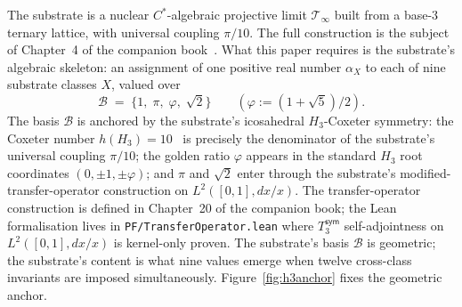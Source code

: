 \documentclass[11pt,a4paper]{amsart}
\theoremstyle{plain}
\theoremstyle{definition}
\begin{document}
The substrate is a nuclear $C^{*}$-algebraic projective limit $\mathcal{T}_\infty$ built from a base-$3$ ternary lattice, with universal coupling $\pi/10$. The full construction is the subject of Chapter~4 of the companion book~\cite{cohen2026book}. What this paper requires is the substrate's algebraic skeleton: an assignment of one positive real number $\alpha_X$ to each of nine substrate classes $X$, valued over
\[
\mathcal{B} \;=\; \{1,\;\pi,\;\varphi,\;\sqrt{2}\} \qquad (\varphi := (1+\sqrt{5})/2).
\]
The basis $\mathcal{B}$ is anchored by the substrate's icosahedral $H_3$-Coxeter symmetry: the Coxeter number $h(H_3) = 10$~\cite{bourbaki1968} is precisely the denominator of the substrate's universal coupling $\pi/10$; the golden ratio $\varphi$ appears in the standard $H_3$ root coordinates $(0, \pm 1, \pm \varphi)$; and $\pi$ and $\sqrt{2}$ enter through the substrate's modified-transfer-operator construction on $L^2([0,1], dx/x)$. The transfer-operator construction is defined in Chapter~20 of the companion book; the Lean formalisation lives in \texttt{PF/TransferOperator.lean} where $T_3^{\textsf{sym}}$ self-adjointness on $L^2([0,1], dx/x)$ is kernel-only proven. The substrate's basis $\mathcal{B}$ is geometric; the substrate's content is what nine values emerge when twelve cross-class invariants are imposed simultaneously. Figure~\ref{fig:h3anchor} fixes the geometric anchor.
\end{document}
